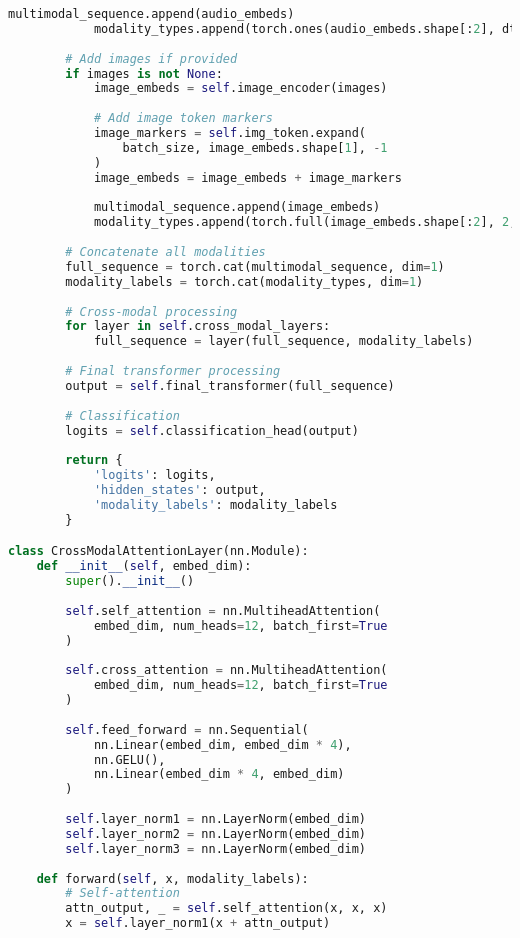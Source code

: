 \begin{lstlisting}[language=Python, caption=Multimodal transformer with audio token integration]
            multimodal_sequence.append(audio_embeds)
            modality_types.append(torch.ones(audio_embeds.shape[:2], dtype=torch.long))
        
        # Add images if provided
        if images is not None:
            image_embeds = self.image_encoder(images)
            
            # Add image token markers
            image_markers = self.img_token.expand(
                batch_size, image_embeds.shape[1], -1
            )
            image_embeds = image_embeds + image_markers
            
            multimodal_sequence.append(image_embeds)
            modality_types.append(torch.full(image_embeds.shape[:2], 2, dtype=torch.long))
        
        # Concatenate all modalities
        full_sequence = torch.cat(multimodal_sequence, dim=1)
        modality_labels = torch.cat(modality_types, dim=1)
        
        # Cross-modal processing
        for layer in self.cross_modal_layers:
            full_sequence = layer(full_sequence, modality_labels)
        
        # Final transformer processing
        output = self.final_transformer(full_sequence)
        
        # Classification
        logits = self.classification_head(output)
        
        return {
            'logits': logits,
            'hidden_states': output,
            'modality_labels': modality_labels
        }

class CrossModalAttentionLayer(nn.Module):
    def __init__(self, embed_dim):
        super().__init__()
        
        self.self_attention = nn.MultiheadAttention(
            embed_dim, num_heads=12, batch_first=True
        )
        
        self.cross_attention = nn.MultiheadAttention(
            embed_dim, num_heads=12, batch_first=True
        )
        
        self.feed_forward = nn.Sequential(
            nn.Linear(embed_dim, embed_dim * 4),
            nn.GELU(),
            nn.Linear(embed_dim * 4, embed_dim)
        )
        
        self.layer_norm1 = nn.LayerNorm(embed_dim)
        self.layer_norm2 = nn.LayerNorm(embed_dim)
        self.layer_norm3 = nn.LayerNorm(embed_dim)
        
    def forward(self, x, modality_labels):
        # Self-attention
        attn_output, _ = self.self_attention(x, x, x)
        x = self.layer_norm1(x + attn_output)
        

\end{lstlisting}
